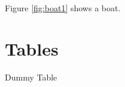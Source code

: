 \documentclass{article}
\begin{document}
  Figure \ref{fig:boat1} shows a boat.

  \section{Tables}
    \begin{table}
      \caption{Dummy Table}
    \end{table}


  \newpage
  \newpage
  \begin{appendix}
    \listoffigures
    \listoftables
  \end{appendix}
\end{document}
